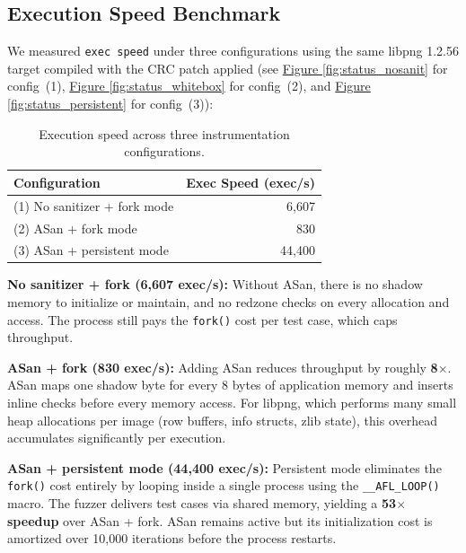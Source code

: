 \documentclass[letterpaper,twocolumn,10pt]{article}
\begin{document}
\subsection{Execution Speed Benchmark}
We measured \texttt{exec speed} under three configurations using the same
libpng 1.2.56 target compiled with the CRC patch applied (see
\hyperref[fig:status_nosanit]{Figure \ref*{fig:status_nosanit}} for config~(1),
\hyperref[fig:status_whitebox]{Figure \ref*{fig:status_whitebox}} for config~(2),
and \hyperref[fig:status_persistent]{Figure \ref*{fig:status_persistent}} for
config~(3)):

\begin{table}[h]
\centering
\small
\begin{tabular}{lr}
\toprule
Configuration & Exec Speed (exec/s) \\
\midrule
(1) No sanitizer + fork mode  &  6,607 \\
(2) ASan + fork mode          &    830 \\
(3) ASan + persistent mode    & 44,400 \\
\bottomrule
\end{tabular}
\caption{Execution speed across three instrumentation configurations.}
\label{tab:execspeed}
\end{table}

\textbf{No sanitizer + fork (6,607 exec/s):} Without ASan, there is no shadow
memory to initialize or maintain, and no redzone checks on every allocation and
access. The process still pays the \texttt{fork()} cost per test case, which
caps throughput.

\textbf{ASan + fork (830 exec/s):} Adding ASan reduces throughput by roughly
\textbf{8$\times$}. ASan maps one shadow byte for every 8 bytes of application
memory and inserts inline checks before every memory access. For libpng, which
performs many small heap allocations per image (row buffers, info structs, zlib
state), this overhead accumulates significantly per execution.

\textbf{ASan + persistent mode (44,400 exec/s):} Persistent mode eliminates the
\texttt{fork()} cost entirely by looping inside a single process using the
\texttt{\_\_AFL\_LOOP()} macro. The fuzzer delivers test cases via shared memory,
yielding a \textbf{53$\times$ speedup} over ASan + fork. ASan remains active but
its initialization cost is amortized over 10,000 iterations before the process
restarts.

\clearpage
\appendix
\end{document}
